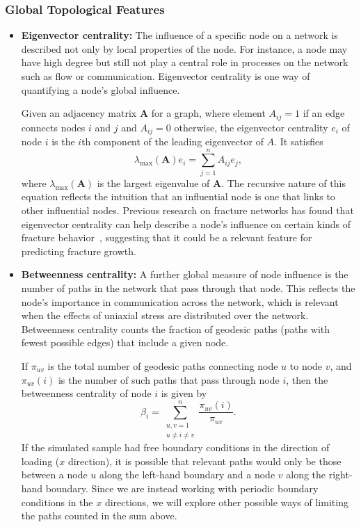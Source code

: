 \subsubsection{Global Topological Features}

\begin{itemize}
    
    
    \item \textbf{Eigenvector centrality:} The influence of a specific node on a network is described not only by local properties of the node.  For instance, a node may have high degree but still not play a central role in processes on the network such as flow or communication.  Eigenvector centrality is one way of quantifying a node's global influence.
    
    Given an adjacency matrix $\mathbf{A}$ for a graph, where element $A_{ij}=1$ if an edge connects nodes $i$ and $j$ and $A_{ij}=0$ otherwise, the eigenvector centrality $e_i$ of node $i$ is the $i$th component of the leading eigenvector of $A$.  It satisfies
    \begin{equation}
    \lambda_{\max}(\mathbf{A}) e_i = \sum_{j=1}^n A_{ij}e_j,
    \end{equation}
    where $\lambda_{\max}(\mathbf{A})$ is the largest eigenvalue of $\mathbf{A}$.  The recursive nature of this equation reflects the intuition that an influential node is one that links to other influential nodes.  Previous research on fracture networks has found that eigenvector centrality can help describe a node's influence on certain kinds of fracture behavior~\cite{santiago2016,valera2018machine}, suggesting that it could be a relevant feature for predicting fracture growth.
    
    \item\textbf{Betweenness centrality:} A further global measure of node influence is the number of paths in the network that pass through that node.  This reflects the node's importance in communication across the network, which is relevant when the effects of uniaxial stress are distributed over the network.  Betweenness centrality counts the fraction of geodesic paths (paths with fewest possible edges) that include a given node.
    
    If $\pi_{uv}$ is the total number of geodesic paths connecting node $u$ to node $v$, and $\pi_{uv}(i)$ is the number of such paths that pass through node $i$, then the betweenness centrality of node $i$ is given by
    \begin{equation}
    \beta_i = \sum_{\substack{u,v = 1 \\ u\neq i\neq v }}^n \frac{\pi_{uv}(i)}{\pi_{uv}}.
    \end{equation}
    If the simulated sample had free boundary conditions in the direction of loading ($x$ direction), it is possible that relevant paths would only be those between a node $u$ along the left-hand boundary and a node $v$ along the right-hand boundary.  Since we are instead working with periodic boundary conditions in the $x$ directions, we will explore other possible ways of limiting the paths counted in the sum above.
\end{itemize}

